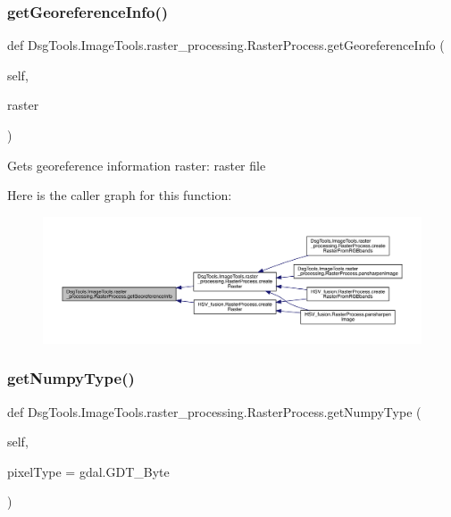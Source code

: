 \subsubsection{\texorpdfstring{get\+Georeference\+Info()}{getGeoreferenceInfo()}}
{\footnotesize\ttfamily def Dsg\+Tools.\+Image\+Tools.\+raster\+\_\+processing.\+Raster\+Process.\+get\+Georeference\+Info (\begin{DoxyParamCaption}\item[{}]{self,  }\item[{}]{raster }\end{DoxyParamCaption})}

\begin{DoxyVerb}Gets georeference information
raster: raster file 
\end{DoxyVerb}
 Here is the caller graph for this function\+:
\nopagebreak
\begin{figure}[H]
\begin{center}
\leavevmode
\includegraphics[width=350pt]{class_dsg_tools_1_1_image_tools_1_1raster__processing_1_1_raster_process_a27bbae0bc866c3f178be14c3f0738d6c_icgraph}
\end{center}
\end{figure}
\mbox{\label{class_dsg_tools_1_1_image_tools_1_1raster__processing_1_1_raster_process_af890891226e6d4972902850f68100d88}} 
\subsubsection{\texorpdfstring{get\+Numpy\+Type()}{getNumpyType()}}
{\footnotesize\ttfamily def Dsg\+Tools.\+Image\+Tools.\+raster\+\_\+processing.\+Raster\+Process.\+get\+Numpy\+Type (\begin{DoxyParamCaption}\item[{}]{self,  }\item[{}]{pixel\+Type = {\ttfamily gdal.GDT\+\_\+Byte} }\end{DoxyParamCaption})}

